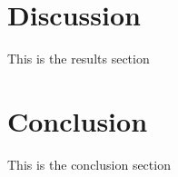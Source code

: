 \documentclass{article}
\begin{document}
\section{Discussion}

This is the results section



\section{Conclusion}
This is the conclusion section



\end{document}
